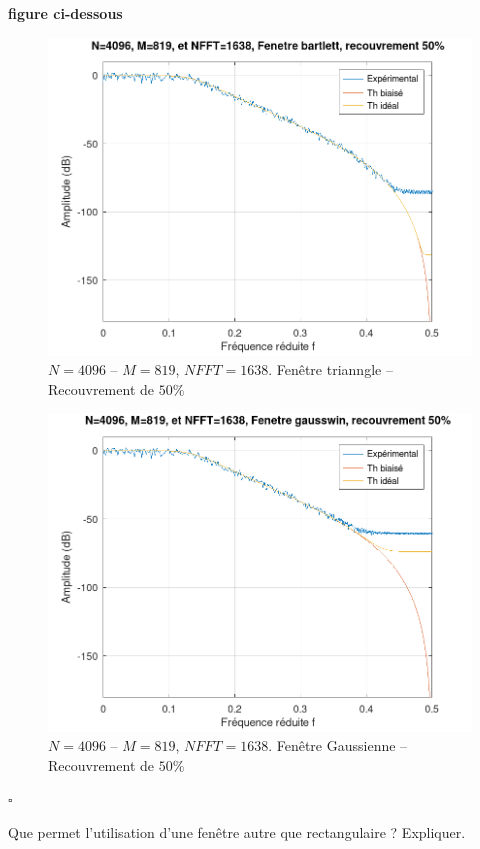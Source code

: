 \documentclass{article}
\newcommand{\debutrep}[1]{\color{blue}\begin{center} \hrulefill \textbf{ #1 } \hrulefill \end{center} }
\newcommand{\finrep}{\vspace*{5mm}\hfill $\square$\color{black}\vspace*{5mm}}
\begin{document}
\begin{enumerate}
\debutrep{figure ci-dessous}
\begin{figure}[H]
\includegraphics[width=\columnwidth]{Variation-fenetre-bartlett.png}
\caption{$N = 4096$ -- $M = 819$, $NFFT = 1638$. Fenêtre trianngle -- Recouvrement de $50\%$}
\end{figure}

\begin{figure}[H]
\includegraphics[width=\columnwidth]{Variation-fenetre-gausswin.png}
\caption{$N = 4096$ -- $M = 819$, $NFFT = 1638$. Fenêtre Gaussienne -- Recouvrement de $50\%$}
\end{figure}

\finrep

Que permet l'utilisation d'une fenêtre autre que rectangulaire ? Expliquer.


\end{enumerate}
\end{document}
